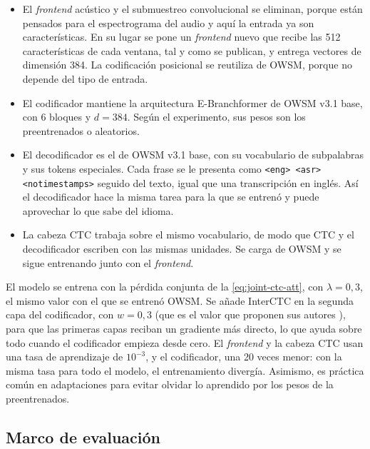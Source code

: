 \begin{itemize}[leftmargin=*, itemsep=0.3em]
  \item El \textit{frontend} acústico y el submuestreo convolucional se eliminan, porque están pensados para el espectrograma del audio y aquí la entrada ya son características. En su lugar se pone un \textit{frontend} nuevo que recibe las 512 características de cada ventana, tal y como se publican, y entrega vectores de dimensión 384. La codificación posicional se reutiliza de OWSM, porque no depende del tipo de entrada.
  \item El codificador mantiene la arquitectura E-Branchformer de OWSM v3.1 base, con 6 bloques y $d = 384$. Según el experimento, sus pesos son los preentrenados o aleatorios.
  \item El decodificador es el de OWSM v3.1 base, con su vocabulario de subpalabras y sus tokens especiales. Cada frase se le presenta como \texttt{<eng> <asr> <notimestamps>} seguido del texto, igual que una transcripción en inglés. Así el decodificador hace la misma tarea para la que se entrenó y puede aprovechar lo que sabe del idioma.
  \item La cabeza CTC trabaja sobre el mismo vocabulario, de modo que CTC y el decodificador escriben con las mismas unidades. Se carga de OWSM y se sigue entrenando junto con el \textit{frontend}.
\end{itemize}

El modelo se entrena con la pérdida conjunta de la \cref{eq:joint-ctc-att}, con $\lambda = 0{,}3$, el mismo valor con el que se entrenó OWSM. Se añade InterCTC en la segunda capa del codificador, con $w = 0{,}3$ (que es el valor que proponen sus autores \cite{lee2021interctc}), para que las primeras capas reciban un gradiente más directo, lo que ayuda sobre todo cuando el codificador empieza desde cero. El \textit{frontend} y la cabeza CTC usan una tasa de aprendizaje de $10^{-3}$, y el codificador, una 20 veces menor: con la misma tasa para todo el modelo, el entrenamiento divergía. Asimismo, es práctica común en adaptaciones para evitar olvidar lo aprendido por los pesos de la preentrenados.

\subsection{Marco de evaluación}
\label{sec:protocolo-evaluacion}

